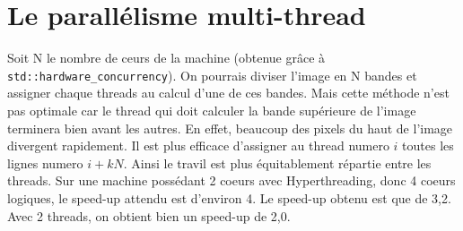 \documentclass{article}
\begin{document}
\section{Le parallélisme multi-thread}
Soit N le nombre de ceurs de la machine (obtenue grâce à \texttt{std::hardware\_concurrency}). On pourrais diviser
l’image en N bandes et assigner chaque threads au calcul d’une de ces bandes. Mais cette méthode n’est pas
optimale car le thread qui doit calculer la bande supérieure de l’image terminera bien avant les autres. En effet,
beaucoup des pixels du haut de l’image divergent rapidement. Il est plus efficace d’assigner au thread numero $i$
toutes les lignes numero $i + kN$. Ainsi le travil est plus équitablement répartie entre les threads. Sur une machine
possédant 2 coeurs avec Hyperthreading, donc 4 coeurs logiques, le speed-up attendu est d’environ 4. Le speed-up
obtenu est que de 3,2. Avec 2 threads, on obtient bien un speed-up de 2,0.
\end{document}
